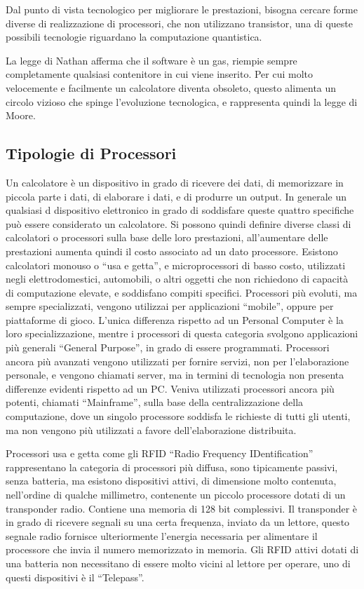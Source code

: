 \documentclass{article}
\numberwithin{equation}{subsection}
\begin{document}
Dal punto di vista tecnologico per migliorare le prestazioni, bisogna cercare forme diverse di realizzazione di processori, che non utilizzano transistor, una di queste possibili 
tecnologie riguardano la computazione quantistica. 


La legge di Nathan afferma che il software è un gas, riempie sempre completamente qualsiasi contenitore in cui viene inserito. Per cui molto velocemente e facilmente un 
calcolatore diventa obsoleto, questo alimenta un circolo vizioso che spinge l'evoluzione tecnologica, e rappresenta quindi la legge di Moore. 

\subsection{Tipologie di Processori}

Un calcolatore è un dispositivo in grado di ricevere dei dati, di memorizzare in piccola parte i dati, di elaborare i dati, e di produrre un output. In generale un qualsiasi d
dispositivo elettronico in grado di soddisfare queste quattro specifiche può essere considerato un calcolatore. 
Si possono quindi definire diverse classi di calcolatori o processori sulla base delle loro prestazioni, all'aumentare delle prestazioni aumenta quindi il costo associato ad 
un dato processore. Esistono calcolatori monouso o ``usa e getta'', e microprocessori di basso costo, utilizzati negli elettrodomestici, automobili, o altri oggetti che non richiedono di capacità 
di computazione elevate, e soddisfano compiti specifici. Processori più evoluti, ma sempre specializzati, vengono utilizzai per applicazioni ``mobile'', oppure per piattaforme 
di gioco. L'unica differenza rispetto ad un Personal Computer è la loro specializzazione, mentre i processori di questa categoria svolgono applicazioni più generali 
``General Purpose'', in grado di essere programmati. Processori ancora più avanzati vengono utilizzati per fornire servizi, non per l'elaborazione personale, e vengono chiamati 
server, ma in termini di tecnologia non presenta differenze evidenti rispetto ad un PC. Veniva utilizzati processori ancora più potenti, chiamati ``Mainframe'', sulla base della 
centralizzazione della computazione, dove un singolo processore soddisfa le richieste di tutti gli utenti, ma non vengono più utilizzati a favore dell'elaborazione 
distribuita. 


Processori usa e getta come gli RFID ``Radio Frequency IDentification'' rappresentano la categoria di processori più diffusa, sono tipicamente passivi, senza batteria, ma esistono 
dispositivi attivi, di dimensione 
molto contenuta, nell'ordine di qualche millimetro, contenente un piccolo processore dotati di un transponder radio. Contiene una memoria di 128 bit complessivi. Il transponder 
è in grado di ricevere segnali su una certa frequenza, inviato da un lettore, questo segnale radio fornisce ulteriormente l'energia necessaria per alimentare il processore 
che invia il numero memorizzato in memoria. 
Gli RFID attivi dotati di una batteria non necessitano di essere molto vicini al lettore per operare, uno di questi dispositivi è il ``Telepass''. 
\end{document}

